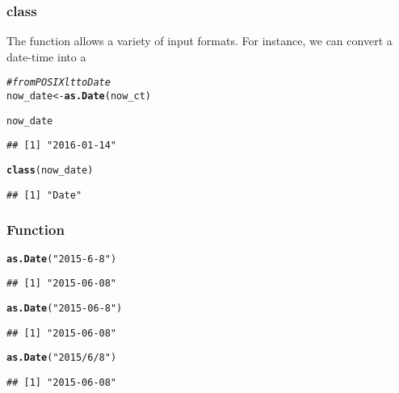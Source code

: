 \documentclass[12pt]{beamer}\usepackage[]{graphicx}\usepackage[]{color}
\makeatletter
\newcommand{\hlstr}[1]{\textcolor[rgb]{0.192,0.494,0.8}{#1}}%
\newcommand{\hlcom}[1]{\textcolor[rgb]{0.678,0.584,0.686}{\textit{#1}}}%
\newcommand{\hlstd}[1]{\textcolor[rgb]{0.345,0.345,0.345}{#1}}%
\newcommand{\hlkwb}[1]{\textcolor[rgb]{0.69,0.353,0.396}{#1}}%
\newcommand{\hlkwd}[1]{\textcolor[rgb]{0.737,0.353,0.396}{\textbf{#1}}}%
\newenvironment{kframe}{%
 \def\at@end@of@kframe{}%
 \ifinner\ifhmode%
  \def\at@end@of@kframe{\end{minipage}}%
  \begin{minipage}{\columnwidth}%
 \fi\fi%
 \def\FrameCommand##1{\hskip\@totalleftmargin \hskip-\fboxsep
 \colorbox{shadecolor}{##1}\hskip-\fboxsep
     \hskip-\linewidth \hskip-\@totalleftmargin \hskip\columnwidth}%
 \MakeFramed {\advance\hsize-\width
   \@totalleftmargin\z@ \linewidth\hsize
   \@setminipage}}%
 {\par\unskip\endMakeFramed%
 \at@end@of@kframe}
\newenvironment{knitrout}{}{} %
\makeatother
\begin{document}
\begin{frame}[fragile]
\frametitle{ class}

The function  allows a variety of input formats. For instance, we can convert a  date-time into a 
\begin{knitrout}\footnotesize
{}\color{fgcolor}\begin{kframe}
\begin{alltt}
\hlcom{# from POSIXlt to Date}
\hlstd{now_date} \hlkwb{<-} \hlkwd{as.Date}\hlstd{(now_ct)}

\hlstd{now_date}
\end{alltt}
\begin{verbatim}
## [1] "2016-01-14"
\end{verbatim}
\begin{alltt}
\hlkwd{class}\hlstd{(now_date)}
\end{alltt}
\begin{verbatim}
## [1] "Date"
\end{verbatim}
\end{kframe}
\end{knitrout}

\end{frame}


\begin{frame}[fragile]
\frametitle{Function }

\begin{knitrout}\footnotesize
{}\color{fgcolor}\begin{kframe}
\begin{alltt}
\hlkwd{as.Date}\hlstd{(}\hlstr{"2015-6-8"}\hlstd{)}
\end{alltt}
\begin{verbatim}
## [1] "2015-06-08"
\end{verbatim}
\begin{alltt}
\hlkwd{as.Date}\hlstd{(}\hlstr{"2015-06-8"}\hlstd{)}
\end{alltt}
\begin{verbatim}
## [1] "2015-06-08"
\end{verbatim}
\begin{alltt}
\hlkwd{as.Date}\hlstd{(}\hlstr{"2015/6/8"}\hlstd{)}
\end{alltt}
\begin{verbatim}
## [1] "2015-06-08"
\end{verbatim}
\end{kframe}
\end{knitrout}

\end{frame}
\end{document}
